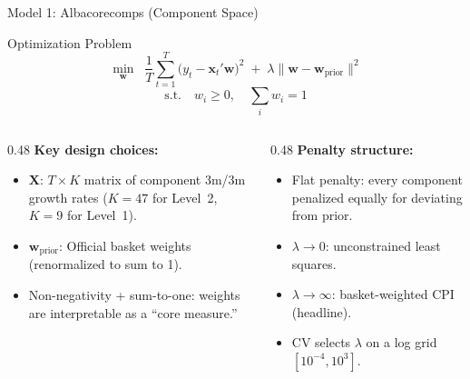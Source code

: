 \documentclass[aspectratio=169, 11pt]{beamer}
\begin{document}
\begin{frame}{Model 1: Albacorecomps (Component Space)}
  \begin{block}{Optimization Problem}
    \[
      \min_{\mathbf{w}} \;\; \frac{1}{T}\sum_{t=1}^{T}\bigl(y_t - \mathbf{x}_t'\mathbf{w}\bigr)^2
      \;+\; \lambda \|\mathbf{w} - \mathbf{w}_{\text{prior}}\|^2
    \]
    \vspace{-6pt}
    \[
      \text{s.t.} \quad w_i \geq 0, \quad \sum_i w_i = 1
    \]
  \end{block}
  \vspace{4pt}
  \begin{columns}[T]
    \begin{column}{0.48\textwidth}
      \textbf{Key design choices:}
      \begin{itemize}
        \item $\mathbf{X}$: $T \times K$ matrix of component 3m/3m growth rates
              ($K = 47$ for Level~2, $K = 9$ for Level~1).
        \item $\mathbf{w}_{\text{prior}}$: Official basket weights
              (renormalized to sum to 1).
        \item Non-negativity + sum-to-one: weights are interpretable
              as a ``core measure.''
      \end{itemize}
    \end{column}
    \begin{column}{0.48\textwidth}
      \textbf{Penalty structure:}
      \begin{itemize}
        \item Flat penalty: every component penalized equally for
              deviating from prior.
        \item $\lambda \to 0$: unconstrained least squares.
        \item $\lambda \to \infty$: basket-weighted CPI (headline).
        \item CV selects $\lambda$ on a log grid $[10^{-4}, 10^{3}]$.
      \end{itemize}
    \end{column}
  \end{columns}
\end{frame}
\end{document}
